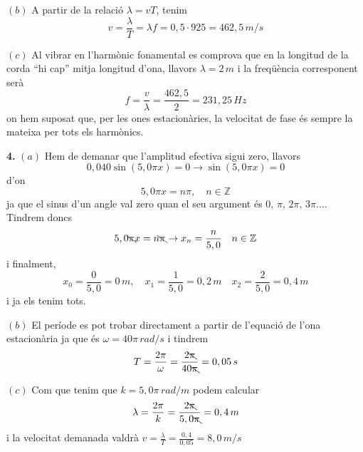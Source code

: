 \documentclass[a4paper,12pt]{article}
\begin{document}
\noindent $(b)$
A partir de la relació $\lambda=v T$, tenim
$$v=\frac{\lambda}{T}=\lambda f=0,5\cdot 925=462,5\,m/s$$
\bigskip

\noindent $(c)$
Al vibrar en l'harmònic fonamental es comprova que en la longitud de la corda ``hi cap'' mitja longitud d'ona, llavors $\lambda=2\,m$ i la freqüència corresponent serà
$$f=\frac{v}{\lambda}=\frac{462,5}{2}=231,25\,Hz$$
on hem suposat que, per les ones estacionàries, la velocitat de fase és sempre la mateixa per tots els harmònics.
\clearpage

\noindent\textbf{4.} $(a)$
Hem de demanar que l'amplitud efectiva sigui zero, llavors
$$0,040\sin(5,0\pi x)=0\rightarrow \sin(5,0\pi x)=0$$
d'on
$$5,0\pi x=n\pi, \quad n\in \mathbb{Z}$$
ja que el sinus d'un angle val zero quan el seu argument és $0,\, \pi,\,2\pi,\, 3\pi...$. Tindrem doncs
$$5,0\bcancel{\pi} x= n\bcancel{\pi}\rightarrow x_{n}=\frac{n}{5,0}\quad n\in\mathbb{Z}$$
i finalment, 
$$x_{0}=\frac{0}{5,0}=0\,m,\quad x_{1}=\frac{1}{5,0}=0,2\,m\quad x_{2}=\frac{2}{5,0}=0,4\,m$$
i ja els tenim tots.
\bigskip

\noindent$(b)$ El període es pot trobar directament a partir de l'equació de l'ona estacionària ja que és $\omega=40\pi\,rad/s$ i tindrem
$$T=\frac{2\pi}{\omega}=\frac{2\bcancel{\pi}}{40\bcancel{\pi}}=0,05\,s$$
\bigskip

\noindent$(c)$ Com que tenim que $k=5,0\pi\,rad/m$ podem calcular
$$\lambda=\frac{2\pi}{k}=\frac{2\bcancel{\pi}}{5,0\bcancel{\pi}}=0,4\,m$$
i la velocitat demanada valdrà
$v=\frac{\lambda}{T} =\frac{0,4}{0,05}=8,0\,m/s$
\end{document}
